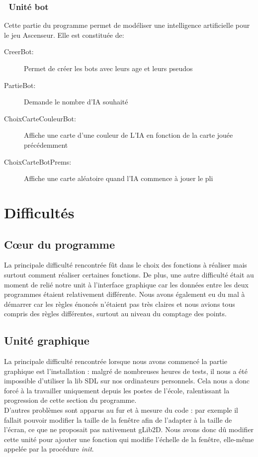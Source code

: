 \documentclass[12pt]{report}
\begin{document}
\subsubsection{\cdot ~Unité bot}
	Cette partie du programme permet de modéliser une intelligence artificielle pour le jeu Ascenseur. Elle est constituée de: \\
\begin{description}
  	\item[CreerBot:] Permet de créer les bots avec leurs age et leurs pseudos
	\item[PartieBot:] Demande le nombre d'IA souhaité
	\item[ChoixCarteCouleurBot:] Affiche une carte d'une couleur de L'IA en fonction de la carte jouée précédemment
	\item[ChoixCarteBotPrems:] Affiche une carte aléatoire quand l'IA commence à jouer le pli	
\end{description}

\clearpage

\section{Difficultés}
	\subsection{Cœur du programme}
	La principale difficulté rencontrée fût dans le choix des fonctions à réaliser mais surtout comment réaliser certaines fonctions. De plus, une autre difficulté était au moment de relié notre unit à l'interface graphique car les données entre les deux programmes étaient relativement différente. Nous avons également eu du mal à démarrer car les règles énoncés n'étaient pas très claires et nous avions tous compris des règles différentes, surtout au niveau du comptage des points.
	
	\subsection{Unité graphique}
	La principale difficulté rencontrée lorsque nous avons commencé la partie graphique est l'installation : malgré de nombreuses heures de tests, il nous a été impossible d'utiliser la lib SDL sur nos ordinateurs personnels. Cela nous a donc forcé à la travailler uniquement depuis les postes de l'école, ralentissant la progression de cette section du programme.\\ 
	
	D'autres problèmes sont apparus au fur et à mesure du code : par exemple il fallait pouvoir modifier la taille de la fenêtre afin de l'adapter à la taille de l'écran, ce que ne proposait pas nativement gLib2D. Nous avons donc dû modifier cette unité pour ajouter une fonction qui modifie l'échelle de la fenêtre, elle-même appelée par la procédure \textit{init}. \\
\end{document}
